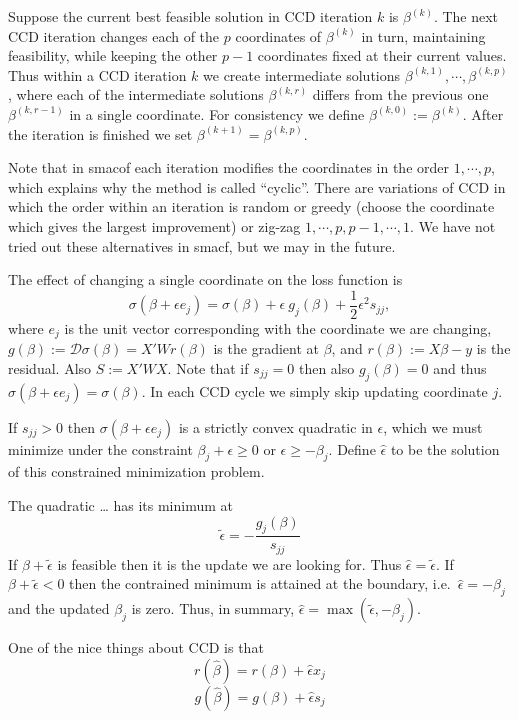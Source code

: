 \documentclass[
  12pt,
]{article}
\begin{document}
Suppose the current best feasible solution in CCD iteration \(k\) is
\(\beta^{(k)}\). The next CCD iteration changes each of the \(p\)
coordinates of \(\beta^{(k)}\) in turn, maintaining feasibility, while
keeping the other \(p-1\) coordinates fixed at their current values. Thus
within a CCD iteration \(k\) we create intermediate solutions
\(\beta^{(k,1)},\cdots,\beta^{(k,p)}\), where each of the intermediate
solutions \(\beta^{(k,r)}\) differs from the previous one
\(\beta^{(k,r-1)}\) in a single coordinate. For consistency we define
\(\beta^{(k,0)}:=\beta^{(k)}\). After the iteration is finished we set
\(\beta^{(k+1)}=\beta^{(k,p)}\).

Note that in smacof each iteration modifies the coordinates in the order
\(1,\cdots,p\), which explains why the method is called ``cyclic''. There
are variations of CCD in which the order within an iteration is random
or greedy (choose the coordinate which gives the largest improvement) or
zig-zag \(1,\cdots,p,p-1,\cdots,1\). We have not tried out these
alternatives in smacf, but we may in the future.

The effect of changing a single coordinate on the loss function is \[
\sigma(\beta+\epsilon e_j)=\sigma(\beta)+\epsilon\ g_j(\beta)+\frac12\epsilon^2s_{jj},
\] where \(e_j\) is the unit vector corresponding with the coordinate we
are changing, \(g(\beta):=\mathcal{D}\sigma(\beta)=X'Wr(\beta)\) is the
gradient at \(\beta\), and \(r(\beta):=X\beta-y\) is the residual. Also
\(S:=X'WX\). Note that if \(s_{jj}=0\) then also \(g_j(\beta)=0\) and thus
\(\sigma(\beta+\epsilon e_j)=\sigma(\beta)\). In each CCD cycle we simply
skip updating coordinate \(j\).

If \(s_{jj}>0\) then \(\sigma(\beta+\epsilon e_j)\) is a strictly convex
quadratic in \(\epsilon\), which we must minimize under the constraint
\(\beta_j+\epsilon\geq 0\) or \(\epsilon\geq-\beta_j\). Define
\(\hat\epsilon\) to be the solution of this constrained minimization
problem.

The quadratic \ldots{} has its minimum at \[
\tilde\epsilon=-\frac{g_j(\beta)}{s_{jj}}
\] If \(\beta+\tilde\epsilon\) is feasible then it is the update we are
looking for. Thus \(\hat\epsilon=\tilde\epsilon\). If
\(\beta+\tilde\epsilon<0\) then the contrained minimum is attained at the
boundary, i.e.~\(\hat\epsilon=-\beta_j\) and the updated \(\beta_j\) is
zero. Thus, in summary, \(\hat\epsilon=\max(\tilde\epsilon,-\beta_j)\).

One of the nice things about CCD is that \[
r(\hat\beta)=r(\beta)+\hat\epsilon x_j
\] \[
g(\hat\beta)=g(\beta)+\hat\epsilon s_j
\]
\end{document}
